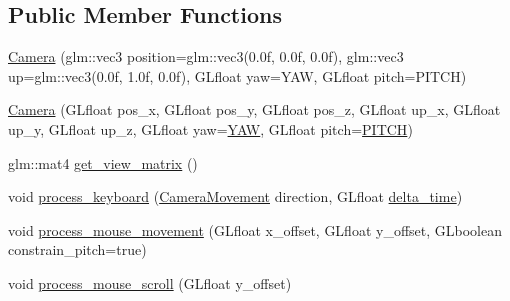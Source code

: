 \subsection*{Public Member Functions}
\begin{DoxyCompactItemize}
\item 
\hyperlink{classCamera_a535f3a2413a88c2f1e7d1147bec0039c}{Camera} (glm\+::vec3 position=glm\+::vec3(0.\+0f, 0.\+0f, 0.\+0f), glm\+::vec3 up=glm\+::vec3(0.\+0f, 1.\+0f, 0.\+0f), G\+Lfloat yaw=\+Y\+A\+W, G\+Lfloat pitch=\+P\+I\+T\+C\+H)
\item 
\hyperlink{classCamera_af0f6ba09d293db5b1c6ba63d195cff57}{Camera} (G\+Lfloat pos\+\_\+x, G\+Lfloat pos\+\_\+y, G\+Lfloat pos\+\_\+z, G\+Lfloat up\+\_\+x, G\+Lfloat up\+\_\+y, G\+Lfloat up\+\_\+z, G\+Lfloat yaw=\hyperlink{classCamera_a79050e94e98c5c1cc0127c41edb4ed16}{Y\+AW}, G\+Lfloat pitch=\hyperlink{classCamera_afd43f32a47d2db8922dc32030fd84379}{P\+I\+T\+CH})
\item 
glm\+::mat4 \hyperlink{classCamera_aedac0150156798ae1880eabaa3b9f071}{get\+\_\+view\+\_\+matrix} ()
\item 
void \hyperlink{classCamera_ac32b5b8c93934f8faa8e8637dec855d4}{process\+\_\+keyboard} (\hyperlink{classCamera_a9825f2bf1ddc209c3b2d336080d8407a}{Camera\+Movement} direction, G\+Lfloat \hyperlink{test_8cpp_a45742981446f2bedcf5573ca6b329564}{delta\+\_\+time})
\item 
void \hyperlink{classCamera_ab650c0e1f0c55582339623e7c3b4b10d}{process\+\_\+mouse\+\_\+movement} (G\+Lfloat x\+\_\+offset, G\+Lfloat y\+\_\+offset, G\+Lboolean constrain\+\_\+pitch=true)
\item 
void \hyperlink{classCamera_a9cb2efbeb1a0007f1ea908e3e74c92a1}{process\+\_\+mouse\+\_\+scroll} (G\+Lfloat y\+\_\+offset)
\end{DoxyCompactItemize}
